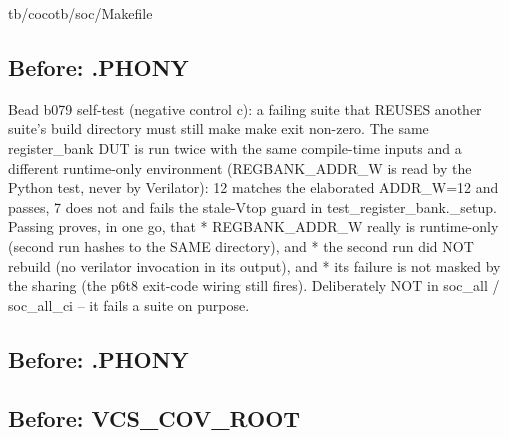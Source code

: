 \begin{relocated}{tb/cocotb/soc/Makefile}
\subsection*{Before: .PHONY}

\begin{textblock}
Bead b079 self-test (negative control c): a failing suite that REUSES another suite's build
directory must still make make exit non-zero.  The same register_bank DUT is run twice with the
same compile-time inputs and a different runtime-only environment (REGBANK_ADDR_W is read by the
Python test, never by Verilator): 12 matches the elaborated ADDR_W=12 and passes, 7 does not and
fails the stale-Vtop guard in test_register_bank._setup.  Passing proves, in one go, that
  * REGBANK_ADDR_W really is runtime-only (second run hashes to the SAME directory), and
  * the second run did NOT rebuild (no verilator invocation in its output), and
  * its failure is not masked by the sharing (the p6t8 exit-code wiring still fires).
Deliberately NOT in soc_all / soc_all_ci -- it fails a suite on purpose.
\end{textblock}

\subsection*{Before: .PHONY}


\subsection*{Before: VCS\_COV\_ROOT}


\end{relocated}
